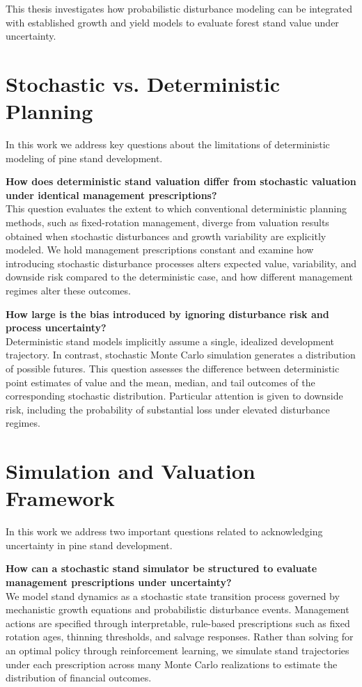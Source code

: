 \documentclass[12pt]{report}
\begin{document}
This thesis investigates how probabilistic disturbance modeling can be integrated with established growth and yield models to evaluate forest stand value under uncertainty.

\section{Stochastic vs. Deterministic Planning}
In this work we address key questions about the limitations of deterministic modeling of pine stand development.

    \textbf{How does deterministic stand valuation differ from stochastic valuation under identical management prescriptions?} \\
    This question evaluates the extent to which conventional deterministic planning methods, such as fixed-rotation management, diverge from valuation results obtained when stochastic disturbances and growth variability are explicitly modeled. We hold management prescriptions constant and examine how introducing stochastic disturbance processes alters expected value, variability, and downside risk compared to the deterministic case, and how different management regimes alter these outcomes.

    \textbf{How large is the bias introduced by ignoring disturbance risk and process uncertainty?} \\
    Deterministic stand models implicitly assume a single, idealized development trajectory. In contrast, stochastic Monte Carlo simulation generates a distribution of possible futures. This question assesses the difference between deterministic point estimates of value and the mean, median, and tail outcomes of the corresponding stochastic distribution. Particular attention is given to downside risk, including the probability of substantial loss under elevated disturbance regimes.

\section{Simulation and Valuation Framework}
In this work we address two important questions related to acknowledging uncertainty in pine stand development.

    \textbf{How can a stochastic stand simulator be structured to evaluate management prescriptions under uncertainty?} \\
    We model stand dynamics as a stochastic state transition process governed by mechanistic growth equations and probabilistic disturbance events. Management actions are specified through interpretable, rule-based prescriptions such as fixed rotation ages, thinning thresholds, and salvage responses. Rather than solving for an optimal policy through reinforcement learning, we simulate stand trajectories under each prescription across many Monte Carlo realizations to estimate the distribution of financial outcomes.
\end{document}

